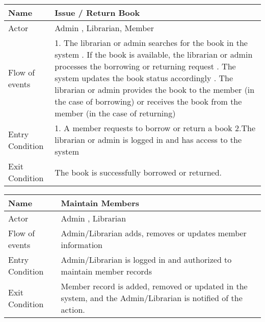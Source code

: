 \begin{center}
\begin{tabular}{ | m{7em} | m{9cm}|}
\end{tabular}

\vspace{1cm}

\begin{tabular}{ | m{7em} | m{9cm}|} 
  \hline
  Name & Issue / Return Book\\ 
  \hline    
  Actor & Admin , Librarian, Member \\ 
  \hline
  Flow of events & 

  1. The librarian or admin searches for the book in the system
  \newline
   2. If the book is available, the librarian or admin processes the borrowing or returning request
     \newline
3.  The system updates the book status accordingly
  \newline
4.  The librarian or admin provides the book to the member (in the case of borrowing) or receives the book from the member (in the case of returning) \\
  \hline
     Entry Condition &
    1. A member requests to borrow or return a book
    \newline
    2.The librarian or admin is logged in and has access to the system\\
  \hline
  Exit Condition & The book is successfully borrowed or returned. \\
  \hline

\end{tabular}

\vspace{1cm}

\begin{tabular}{ | m{7em} | m{9cm}|} 
  \hline
   Name & Maintain Members\\ 
  \hline    
  Actor & Admin , Librarian \\ 
  \hline
  Flow of events & 

    Admin/Librarian adds, removes or updates member information \\
  \hline
  
   Entry Condition & Admin/Librarian is logged in and authorized to maintain member records \\
  \hline
  Exit Condition & Member record is added, removed or updated in the system, and the Admin/Librarian is notified of the action. \\
  \hline

\end{tabular}


\vspace{1cm}

\end{center}
